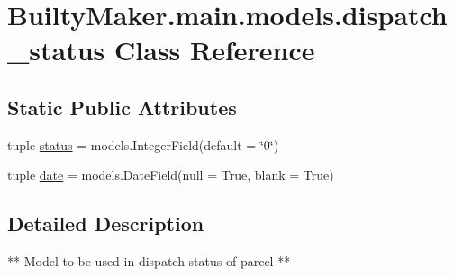 \hypertarget{classBuiltyMaker_1_1main_1_1models_1_1dispatch__status}{\section{\-Builty\-Maker.\-main.\-models.\-dispatch\-\_\-status \-Class \-Reference}
\label{classBuiltyMaker_1_1main_1_1models_1_1dispatch__status}
}
\subsection*{\-Static \-Public \-Attributes}
\begin{DoxyCompactItemize}
\item 
tuple \hyperlink{classBuiltyMaker_1_1main_1_1models_1_1dispatch__status_af0f61dbc1de0bd586addfd370ab5e3e2}{status} = models.\-Integer\-Field(default = \char`\"{}0\char`\"{})
\item 
tuple \hyperlink{classBuiltyMaker_1_1main_1_1models_1_1dispatch__status_a9d28ee2995889245a4215886dac05fee}{date} = models.\-Date\-Field(null = \-True, blank = \-True)
\end{DoxyCompactItemize}


\subsection{\-Detailed \-Description}
\begin{DoxyVerb}
        ** Model to be used in dispatch status of parcel **
\end{DoxyVerb}
 

